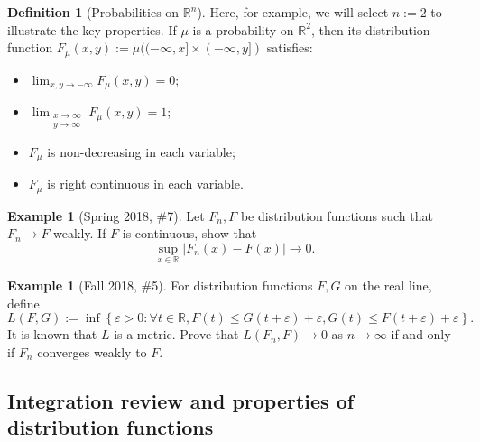 \documentclass[12pt,reqno]{article}
\theoremstyle{plain}
\theoremstyle{definition}
\newtheorem{definition}[theorem]{Definition}
\newtheorem{example}[theorem]{Example}
\begin{document}
\begin{definition}[Probabilities on $\mathbb{R}^n$]
Here, for example, we will select $n := 2$ to illustrate the key properties.
If $\mu$ is a probability on $\mathbb{R}^2$, then its distribution 
function $F_{\mu}(x, y) := \mu((-\infty,x] \times (-\infty,y])$ 
satisfies:
\begin{itemize}

\item[(1)] $\lim_{x,y \rightarrow -\infty} F_{\mu}(x, y) = 0$; 
\item[(2)] $\lim_{\substack{x \rightarrow \infty \\ y \rightarrow \infty}} 
     F_{\mu}(x, y) = 1$; 
\item[(3)] $F_{\mu}$ is non-decreasing in each variable; 
\item[(4)] $F_{\mu}$ is right continuous in each variable. 

\end{itemize} 
\end{definition} 

\begin{example}[Spring 2018, \#7]
Let $F_n,F$ be distribution functions such that $F_n \rightarrow F$ weakly. 
If $F$ is continuous, show that 
\[
\sup_{x \in \mathbb{R}} |F_n(x) - F(x)| \longrightarrow 0. 
\]
\end{example} 

\begin{example}[Fall 2018, \#5]
For distribution functions $F,G$ on the real line, define 
\[
L(F, G) := \inf\left\{\varepsilon>0: \forall t \in \mathbb{R}, 
     F(t) \leq G(t+\varepsilon) + \varepsilon, 
     G(t) \leq F(t+\varepsilon) + \varepsilon\right\}. 
\]
It is known that $L$ is a metric. Prove that $L(F_n, F) \rightarrow 0$ as 
$n \rightarrow \infty$ if and only if $F_n$ converges weakly to $F$. 
\end{example} 

\subsection{Integration review and properties of distribution functions} 
\end{document}
